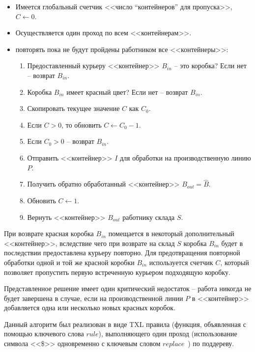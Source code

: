 \begin{itemize}[noitemsep]
  \item Имеется глобальный счетчик <<число ``контейнеров'' для пропуска>>, $C \leftarrow 0$.
  \item Осуществляется один проход по всем <<контейнерам>>.

  \item повторять пока не будут пройдены работником все <<контейнеры>>:
    \begin{enumerate}[noitemsep]
      \item Предоставленный курьеру <<контейнер>> $B_{in}$ -- это коробка? Если нет -- возврат $B_{in}$.
      \item Коробка $B_{in}$ имеет красный цвет? Если нет -- возврат $B_{in}$.
      \item Скопировать текущее значение $C$ как $C_0$.
      \item Если $C > 0$, то обновить $C \leftarrow C_0 - 1$.
      \item Если $C_0 > 0$ -- возврат $B_{in}$.
      \item Отправить <<контейнер>> $I$ для обработки на производственную линию $P$.
      \item Получить обратно обработанный <<контейнер>> $B_{out} = \hat{B}$.
      \item Обновить $C \leftarrow 1$.
      \item Вернуть <<контейнер>> $B_{out}$ работнику склада $S$.
    \end{enumerate}
\end{itemize}

При возврате красная коробка $B_{in}$ помещается в некоторый дополнительный <<контейнер>>, вследствие чего при возврате на склад $S$ коробка $B_{in}$ будет в последствии предоставлена курьеру повторно.
Для предотвращения повторной обработки одной и той же красной коробки $B_{in}$ используется счетчик $C$, который позволяет пропустить первую встреченную курьером подходящую коробку.

Представленное решение имеет один критический недостаток -- работа никогда не будет завершена в случае, если на производственной линии $P$ в <<контейнер>> добавляется одна или несколько новых красных коробок.

Данный алгоритм был реализован в виде TXL правила (функция, объявленная с помощью ключевого слова $rule$), выполняющего один проход (использование символа <<\$>> одновременно с ключевым словом $replace$~\cite{txl-book}) по поддереву.

